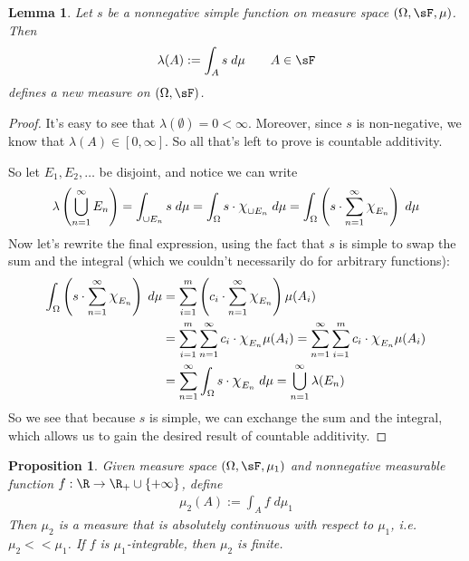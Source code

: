 \documentclass[12pt]{article}
\theoremstyle{plain}
\newtheorem{lem}[thm]{Lemma}
\newtheorem{prop}[thm]{Proposition}
\theoremstyle{definition}
\theoremstyle{remark}
\newcommand*{\Chi}{\mbox{\large$\chi$}} %
\newcommand{\ra}{\rightarrow}
\begin{document}
\begin{lem}
Let $s$ be a nonnegative simple function on measure space
$(\Omega,\sF,\mu)$. Then
\begin{align*}
  \lambda(A) := \int_A s \; d\mu
  \qquad A \in \sF
\end{align*}
defines a new measure on $(\Omega,\sF)$.
\end{lem}
\begin{proof}
It's easy to see that $\lambda(\emptyset) = 0<\infty$. Moreover, since
$s$ is non-negative, we know that $\lambda(A) \in [0,\infty]$. So all
that's left to prove is countable additivity.

So let $E_1, E_2,\ldots$ be disjoint, and notice we can write
\begin{align*}
    \lambda\left(\bigcup^\infty_{n=1} E_n\right)
    = \int_{\cup E_n} s \;d\mu =
    \int_{\Omega} s \cdot \Chi_{\cup E_n}\;d\mu =
    \int_{\Omega} \left(s \cdot
    \sum^\infty_{n=1}\Chi_{E_n}\right)\;d\mu
\end{align*}
Now let's rewrite the final expression, using the fact that $s$ is
simple to swap the sum and the integral (which we couldn't necessarily
do for arbitrary functions):
\begin{align*}
    \int_{\Omega} \left(s \cdot  \sum^\infty_{n=1}
    \Chi_{E_n}\right)\;d\mu
    &= \sum^m_{i=1} \left(c_i \cdot
    \sum^\infty_{n=1}\Chi_{E_n}
    \right)\mu(A_i) \\
    &= \sum^m_{i=1} \sum^\infty_{n=1}c_i \cdot \Chi_{E_n}
    \mu(A_i)
    =  \sum^\infty_{n=1}\sum^m_{i=1} c_i \cdot \Chi_{E_n}
    \mu(A_i) \\
    &=   \sum^\infty_{n=1}\int_\Omega s \cdot \Chi_{E_n}
        \; d\mu =  \bigcup^\infty_{n=1}\lambda(E_n)
\end{align*}
So we see that because $s$ is simple, we can exchange the sum and the
integral, which allows us to gain the desired result of countable
additivity.
\end{proof}

\begin{prop}
Given measure space $(\Omega,\sF,\mu_1)$ and nonnegative measurable
function $f:\R\ra \R_+\cup\{+\infty\}$, define
\begin{align*}
  \mu_2(A) := \int_A f \; d\mu_1
\end{align*}
Then $\mu_2$ is a measure that is absolutely continuous with respect to
$\mu_1$, i.e. $\mu_2 << \mu_1$. If $f$ is $\mu_1$-integrable, then
$\mu_2$ is finite.
\end{prop}
\end{document}
